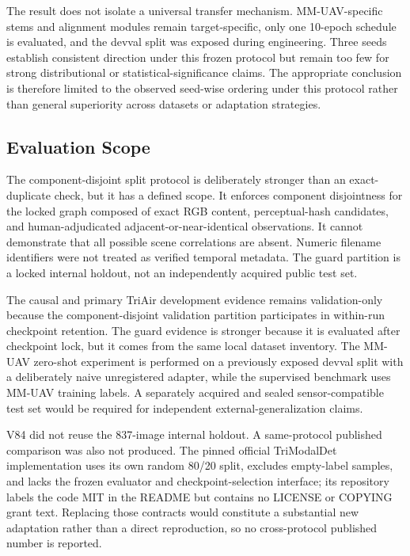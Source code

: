 The result does not isolate a universal transfer mechanism. MM-UAV-specific stems and alignment modules remain target-specific, only one 10-epoch schedule is evaluated, and the devval split was exposed during engineering. Three seeds establish consistent direction under this frozen protocol but remain too few for strong distributional or statistical-significance claims. The appropriate conclusion is therefore limited to the observed seed-wise ordering under this protocol rather than general superiority across datasets or adaptation strategies.

\subsection{Evaluation Scope}
The component-disjoint split protocol is deliberately stronger than an exact-duplicate check, but it has a defined scope. It enforces component disjointness for the locked graph composed of exact RGB content, perceptual-hash candidates, and human-adjudicated adjacent-or-near-identical observations. It cannot demonstrate that all possible scene correlations are absent. Numeric filename identifiers were not treated as verified temporal metadata. The guard partition is a locked internal holdout, not an independently acquired public test set.

The causal and primary TriAir development evidence remains validation-only because the component-disjoint validation partition participates in within-run checkpoint retention. The guard evidence is stronger because it is evaluated after checkpoint lock, but it comes from the same local dataset inventory. The MM-UAV zero-shot experiment is performed on a previously exposed devval split with a deliberately naive unregistered adapter, while the supervised benchmark uses MM-UAV training labels. A separately acquired and sealed sensor-compatible test set would be required for independent external-generalization claims.

V84 did not reuse the 837-image internal holdout. A same-protocol published comparison was also not produced. The pinned official TriModalDet implementation uses its own random 80/20 split, excludes empty-label samples, and lacks the frozen evaluator and checkpoint-selection interface; its repository labels the code MIT in the README but contains no LICENSE or COPYING grant text. Replacing those contracts would constitute a substantial new adaptation rather than a direct reproduction, so no cross-protocol published number is reported.

